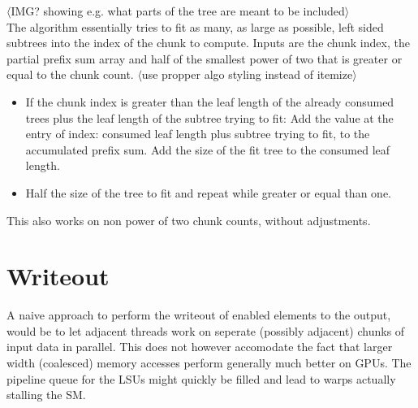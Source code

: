 \documentclass{tudscrreprt}
\newcommand{\markr}[1]{\textcolor{review}{$\langle$#1$\rangle$}}
\begin{document}
				\markr{IMG? showing e.g. what parts of the tree are meant to be included}\\
				The algorithm essentially tries to fit as many, as large as possible, left sided subtrees into the index of the chunk to compute. Inputs are the chunk index, the partial prefix sum array and half of the smallest power of two that is greater or equal to the chunk count.
				\markr{use propper algo styling instead of itemize}\\
				\begin{itemize}
					\item If the chunk index is greater than the leaf length of the already consumed trees plus the leaf length of the subtree trying to fit:
						\subitem Add the value at the entry of index: consumed leaf length plus subtree trying to fit, to the accumulated prefix sum.
						\subitem Add the size of the fit tree to the consumed leaf length.
					\item Half the size of the tree to fit and repeat while greater or equal than one.
				\end{itemize}
				This also works on non power of two chunk counts, without adjustments.
			
		\section{Writeout}
			A naive approach to perform the writeout of enabled elements to the output, would be to let adjacent threads work on seperate (possibly adjacent) chunks of input data in parallel. This does not however accomodate the fact that larger width (coalesced) memory accesses perform generally much better on GPUs. The pipeline queue for the LSUs might quickly be filled and lead to warps actually stalling the SM. \\
			
\end{document}
